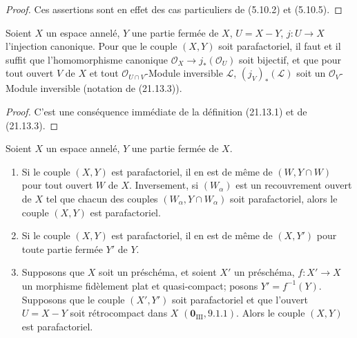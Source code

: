\begin{proof}
Ces assertions sont en effet des cas particuliers de (5.10.2) et (5.10.5).
\end{proof}

\begin{proposition}[21.13.5]
\label{IV.21.13.5}
Soient $X$ un espace annelé, $Y$ une partie fermée de $X$, $U=X-Y$,
$j:U\to X$ l'injection canonique. Pour que le couple $(X,Y)$ soit parafactoriel, il
faut et il suffit que l'homomorphisme canonique $\mathcal O_X\to j_*(\mathcal O_U)$
soit bijectif, et que pour tout ouvert $V$ de $X$ et tout
$\mathcal O_{U\cap V}$-Module inversible $\mathscr L$, $(j_V)_*(\mathscr L)$ soit un
$\mathcal O_V$-Module inversible (notation de (21.13.3)).
\end{proposition}

\begin{proof}
C'est une conséquence immédiate de la définition (21.13.1) et de (21.13.3).
\end{proof}

\begin{corollary}[21.13.6]
\label{IV.21.13.6}
Soient $X$ un espace annelé, $Y$ une partie fermée de $X$.
\begin{enumerate}[label=(\roman*)]
  \item Si le couple $(X,Y)$ est parafactoriel, il en est de même de
  $(W,Y\cap W)$ pour tout ouvert $W$ de $X$. Inversement, si $(W_\alpha)$ est un
  recouvrement ouvert de $X$ tel que chacun des couples
  $(W_\alpha,Y\cap W_\alpha)$ soit parafactoriel, alors le couple $(X,Y)$ est
  parafactoriel.
  \item Si le couple $(X,Y)$ est parafactoriel, il en est de même de $(X,Y')$ pour
  toute partie fermée $Y'$ de $Y$.
  \item Supposons que $X$ soit un préschéma, et soient $X'$ un préschéma,
  $f:X'\to X$ un morphisme fidèlement plat et quasi-compact; posons
  $Y'=f^{-1}(Y)$. Supposons que le couple $(X',Y')$ soit parafactoriel et que
  l'ouvert $U=X-Y$ soit rétrocompact dans $X$ $(\mathbf 0_{\mathrm{III}}, 9.1.1)$.
  Alors le couple $(X,Y)$ est parafactoriel.
\end{enumerate}
\end{corollary}

